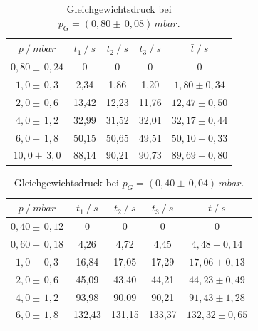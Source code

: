 \begin{table}[H]
\centering
\begin{tabular}{c|c|c|c|c}
	{$p \:/\: \si{mbar}$} & {$t_1 \:/\: \si{s} $} & {$t_2 \:/\: \si{s} $} & {$t_3 \:/\: \si{s} $} & {$\bar{t} \:/\: \si{s}$}\\
\midrule
$0,80 \pm \, 0,24$ &0 &0 &0 &0\\
$1,0 \pm \, 0,3$ &   2,34 &  1,86 &  1,20 & $1,80 \pm 0,34$\\
$2,0 \pm \, 0,6$ &   13,42  &  12,23 &  11,76 & $12,47 \pm 0,50 $\\
$4,0 \pm \, 1,2$ &   32,99 &  31,52 &  32,01 & $32,17 \pm 0,44 $\\
$6,0 \pm \, 1,8$  &   50,15 &  50,65 &  49,51 & $50,10 \pm 0,33 $\\
$10,0 \pm \, 3,0$ &   88,14 &  90,21 &  90,73 & $89,69 \pm 0,80 $\\
\end{tabular}
\caption{Gleichgewichtsdruck bei $p_G=(0,80 \pm \, 0,08) \, \si{mbar}$.}
\label{tab:leck_Dreh2}
\end{table}

\begin{table}[H]
\centering
\begin{tabular}{c|c|c|c|c}
	{$p \:/\: \si{mbar}$} & {$t_1 \:/\: \si{s} $} & {$t_2 \:/\: \si{s} $} & {$t_3 \:/\: \si{s} $} & {$\bar{t} \:/\: \si{s}$}\\
\midrule
$0,40 \pm \, 0,12$ &0 &0 &0 &0\\
$0,60 \pm \, 0,18$ &   4,26 &  4,72 &  4,45 & $4,48 \pm 0,14$\\
$1,0 \pm \, 0,3$ &   16,84  &  17,05 &  17,29 & $17,06 \pm 0,13 $\\
$2,0 \pm \, 0,6$ &   45,09 &  43,40 &  44,21 & $44,23 \pm 0,49 $\\
$4,0 \pm \, 1,2$ &   93,98 &  90,09 & 90,21 & $91,43 \pm 1,28 $\\
$6,0 \pm \, 1,8$ &   132,43 &  131,15 &  133,37 & $132,32 \pm 0,65 $\\
\end{tabular}
\caption{Gleichgewichtsdruck bei $p_G=(0,40 \pm \, 0,04) \, \si{mbar}$.}
\label{tab:leck_Dreh3}
\end{table}

